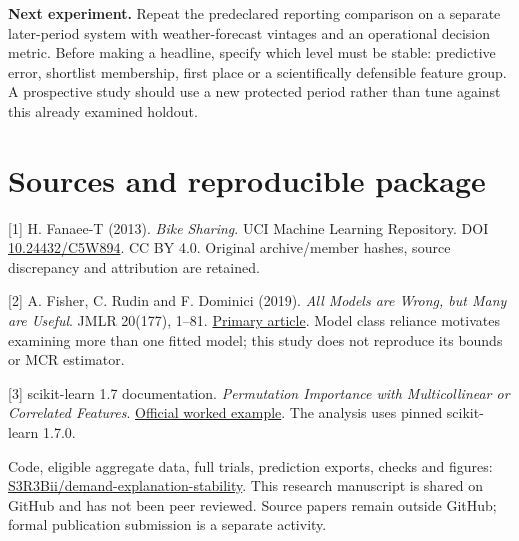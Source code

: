 \documentclass[11pt,letterpaper]{article}
\begin{document}
\textbf{Next experiment.} Repeat the predeclared reporting comparison on a separate later-period system with weather-forecast vintages and an operational decision metric. Before making a headline, specify which level must be stable: predictive error, shortlist membership, first place or a scientifically defensible feature group. A prospective study should use a new protected period rather than tune against this already examined holdout.

\section*{Sources and reproducible package}
\small
[1] H. Fanaee-T (2013). \emph{Bike Sharing}. UCI Machine Learning Repository. DOI \href{https://doi.org/10.24432/C5W894}{10.24432/C5W894}. CC BY 4.0. Original archive/member hashes, source discrepancy and attribution are retained.

[2] A. Fisher, C. Rudin and F. Dominici (2019). \emph{All Models are Wrong, but Many are Useful}. JMLR 20(177), 1--81. \href{https://www.jmlr.org/papers/v20/18-760.html}{Primary article}. Model class reliance motivates examining more than one fitted model; this study does not reproduce its bounds or MCR estimator.

[3] scikit-learn 1.7 documentation. \emph{Permutation Importance with Multicollinear or Correlated Features}. \href{https://scikit-learn.org/1.7/auto_examples/inspection/plot_permutation_importance_multicollinear.html}{Official worked example}. The analysis uses pinned scikit-learn 1.7.0.

Code, eligible aggregate data, full trials, prediction exports, checks and figures:
\href{https://github.com/S3R3Bii/demand-explanation-stability}{S3R3Bii/demand-explanation-stability}. This research manuscript is shared on GitHub and has not been peer reviewed. Source papers remain outside GitHub; formal publication submission is a separate activity.
\end{document}
